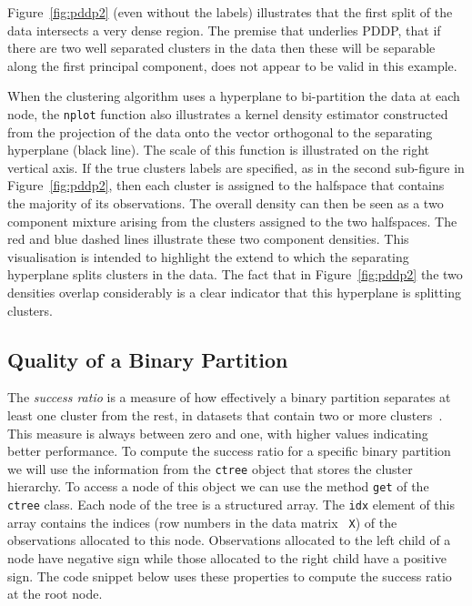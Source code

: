 \documentclass{book}
\begin{document}
\noindent
%
Figure~\ref{fig:pddp2} (even without the labels) illustrates that the first
split of the data intersects a very dense region. The premise that underlies
PDDP, that if there are two well separated clusters in the data then these will
be separable along the first principal component, does not appear to be valid
in this example.


When the clustering algorithm uses a hyperplane to bi-partition the data at
each node, the {\tt nplot} function also illustrates a kernel density estimator
constructed from the projection of the data onto the vector orthogonal to the
separating hyperplane (black line). The scale of this function is illustrated
on the right vertical axis.
%
If the true clusters labels are specified, as in the second sub-figure in
Figure~\ref{fig:pddp2}, then each cluster is assigned to the halfspace that
contains the majority of its observations. The overall density can then be seen
as a two component mixture arising from the clusters assigned to the
two halfspaces. The red and blue dashed lines illustrate these two component
densities. This visualisation is intended to highlight the extend to which the
separating hyperplane splits clusters in the data.
%
The fact that in Figure~\ref{fig:pddp2} the two densities overlap considerably is a
clear indicator that this hyperplane is splitting clusters.


\subsection{Quality of a Binary Partition}

The {\em success ratio} is a measure of how
effectively a binary partition separates at least one cluster from the
rest, in datasets that contain two or more clusters~\cite{PavlidisHT2016}. This measure
is always between zero and one, with higher values indicating better performance.
%
To compute the success ratio for a specific
binary partition we will use the information from the {\tt ctree}
object that stores the cluster hierarchy.
%
To access a node of this object we can use the method {\tt get} of the {\tt
ctree} class. Each node of the tree is a structured array. The {\tt idx}
element of this array contains the indices (row numbers in the data matrix {\tt
X}) of the observations allocated to this node. Observations allocated to the
left child of a node have negative sign while those allocated to the right
child have a positive sign. The code snippet below uses these properties to
compute the success ratio at the root node.
\end{document}
